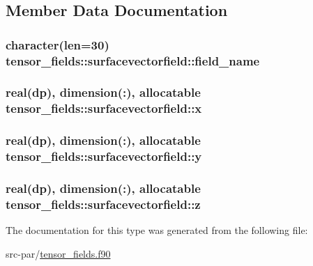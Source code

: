 \subsection{Member Data Documentation}
\hypertarget{structtensor__fields_1_1surfacevectorfield_a4531e0a45bcf34e0fd85ece4e9b513f4}{
\subsubsection[{field\-\_\-name}]{\setlength{\rightskip}{0pt plus 5cm}character(len=30) tensor\-\_\-fields\-::surfacevectorfield\-::field\-\_\-name}}\label{structtensor__fields_1_1surfacevectorfield_a4531e0a45bcf34e0fd85ece4e9b513f4}
\hypertarget{structtensor__fields_1_1surfacevectorfield_a67eee9b7c4ee8d65d0aff88ab39a3b97}{
\subsubsection[{x}]{\setlength{\rightskip}{0pt plus 5cm}real(dp), dimension(\-:), allocatable tensor\-\_\-fields\-::surfacevectorfield\-::x}}\label{structtensor__fields_1_1surfacevectorfield_a67eee9b7c4ee8d65d0aff88ab39a3b97}
\hypertarget{structtensor__fields_1_1surfacevectorfield_a9a11b3cc0f2e359e112fb0d914296460}{
\subsubsection[{y}]{\setlength{\rightskip}{0pt plus 5cm}real(dp), dimension(\-:), allocatable tensor\-\_\-fields\-::surfacevectorfield\-::y}}\label{structtensor__fields_1_1surfacevectorfield_a9a11b3cc0f2e359e112fb0d914296460}
\hypertarget{structtensor__fields_1_1surfacevectorfield_a098c4f5d5b58c380841e0c4d0dc243a3}{
\subsubsection[{z}]{\setlength{\rightskip}{0pt plus 5cm}real(dp), dimension(\-:), allocatable tensor\-\_\-fields\-::surfacevectorfield\-::z}}\label{structtensor__fields_1_1surfacevectorfield_a098c4f5d5b58c380841e0c4d0dc243a3}


The documentation for this type was generated from the following file\-:\begin{DoxyCompactItemize}
\item 
src-\/par/\hyperlink{tensor__fields_8f90}{tensor\-\_\-fields.\-f90}\end{DoxyCompactItemize}
